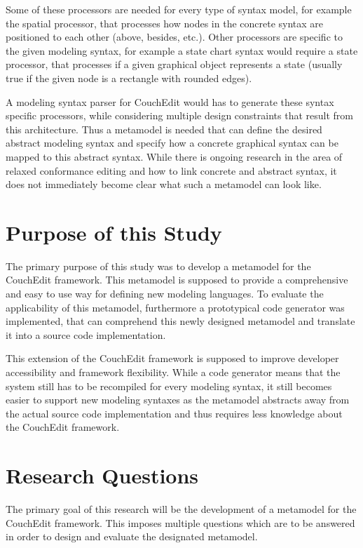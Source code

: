 Some of these processors are needed for every type of syntax model, for example the spatial processor, that processes how nodes in the concrete syntax are positioned to each other (above, besides, etc.). Other processors are specific to the given modeling syntax, for example a state chart syntax would require a state processor, that processes if a given graphical object represents a state (usually true if the given node is a rectangle with rounded edges).

A modeling syntax parser for CouchEdit would has to generate these syntax specific processors, while considering multiple design constraints that result from this architecture. Thus a metamodel is needed that can define the desired abstract modeling syntax and specify how a concrete graphical syntax can be mapped to this abstract syntax. While there is ongoing research in the area of relaxed conformance editing and how to link concrete and abstract syntax, it does not immediately become clear what such a metamodel can look like.

\section{Purpose of this Study}
The primary purpose of this study was to develop a metamodel for the CouchEdit framework. This metamodel is supposed to provide a comprehensive and easy to use way for defining new modeling languages. To evaluate the applicability of this metamodel, furthermore a prototypical code generator was implemented, that can comprehend this newly designed metamodel and translate it into a source code implementation.

This extension of the CouchEdit framework is supposed to improve developer accessibility and framework flexibility. While a code generator means that the system still has to be recompiled for every modeling syntax, it still becomes easier to support new modeling syntaxes as the metamodel abstracts away from the actual source code implementation and thus requires less knowledge about the CouchEdit framework.


\section{Research Questions}

The primary goal of this research will be the development of a metamodel for the CouchEdit framework. This imposes multiple questions which are to be answered in order to design and evaluate the designated metamodel.

